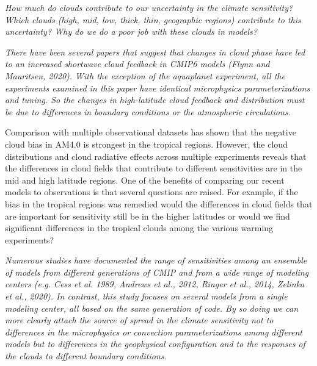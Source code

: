 \documentclass[draft]{agujournal2019}
\begin{document}
\textit{How much do clouds contribute to our uncertainty in the climate sensitivity?  
Which clouds (high, mid, low, thick, thin, geographic regions) contribute to this uncertainty?
Why do we do a poor job with these clouds in models? }

\textit{There have been several papers that suggest that changes in cloud phase have led to an increased shortwave cloud feedback in CMIP6 models (Flynn and Mauritsen, 2020).  With the exception of the aquaplanet experiment, all the experiments examined in this paper have identical microphysics parameterizations and tuning.  So the changes in high-latitude cloud feedback and distribution must be due to differences in boundary conditions or the atmospheric circulations.}



Comparison with multiple observational datasets has shown that the negative cloud bias
in AM4.0 is strongest in the tropical regions.  However, the cloud distributions and 
cloud radiative effects across multiple experiments reveals that the differences in cloud fields that 
contribute to different sensitivities are in the mid and high latitude regions.  One of the benefits of comparing 
our recent models to observations is that several questions are raised.  For example, if the bias in 
the tropical regions was remedied would the differences in cloud fields that are important for sensitivity
still be in the higher latitudes or would we find significant differences in the tropical clouds among 
the various warming experiments?     

\textit{Numerous studies have documented the range of sensitivities among an ensemble of models from different
generations of CMIP and from a wide range of modeling centers (e.g. Cess et al. 1989, Andrews et al., 2012, Ringer et al., 2014, Zelinka et al., 2020).  
In contrast, this study focuses on several models from a single modeling center, all based on the same generation of code.  By so doing we can more clearly attach the source of spread in the climate sensitivity not to 
differences in the microphysics or convection parameterizations among different models but to differences in the geophysical configuration and to the 
responses of the clouds to different boundary conditions.}
\end{document}
